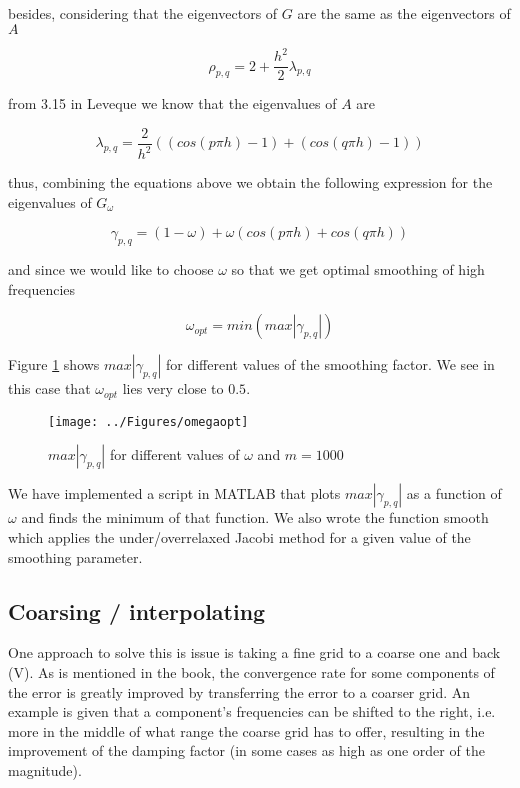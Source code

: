 \documentclass[main.tex]{subfiles}
\begin{document}
besides, considering that the eigenvectors of $G$ are the same as the eigenvectors of $A$

\begin{equation}
\rho_{p,q} = 2 + \frac{h^2}{2} \lambda_{p,q}
\end{equation}

from 3.15 in Leveque we know that the eigenvalues of $A$ are

\begin{equation}
\lambda_{p,q} = \frac{2}{h^2}((cos(p \pi h) -1) + (cos(q \pi h) -1 ))
\end{equation}

thus, combining the equations above we obtain the following expression for the eigenvalues of $G_\omega$

\begin{equation}
\gamma_{p,q} = (1-\omega) + \omega ( cos(p \pi h) + cos(q \pi h))
\end{equation}

and since we would like to choose $\omega$ so that we get optimal smoothing of high frequencies

\begin{equation}
\omega_{opt} = min ( max |\gamma_{p,q}|)
\end{equation}

Figure \ref{fig:omegaopt} shows $max |\gamma_{p,q}|$ for different values of the smoothing factor. We see in this case that $\omega_{opt}$ lies very close to $0.5$.

\begin{figure}[h]
    \centering
    \texttt{[image: ../Figures/omegaopt]}
    \caption{$max |\gamma_{p,q}|$ for different values of $\omega$ and $m = 1000$}
    \label{fig:omegaopt}
\end{figure}

We have implemented a script in MATLAB that plots $max |\gamma_{p,q}|$ as a function of $\omega$ and finds the minimum of that function. We also wrote the function smooth which applies the under/overrelaxed Jacobi method for a given value of the smoothing parameter.

\subsection{Coarsing / interpolating}
One approach to solve this is issue is taking a fine grid to a coarse one and back (V). As is mentioned in the book, the convergence rate for some components of the error is greatly improved by transferring the error to a coarser grid. An example is given that a component's frequencies can be shifted to the right, i.e. more in the middle of what range the coarse grid has to offer, resulting in the improvement of the damping factor (in some cases as high as one order of the magnitude).
\end{document}

